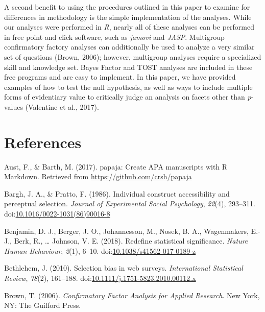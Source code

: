 \documentclass[english,man, mask]{apa6}
\theoremstyle{definition}
\theoremstyle{definition}
\theoremstyle{definition}
\theoremstyle{remark}
\begin{document}
A second benefit to using the procedures outlined in this paper to
examine for differences in methodology is the simple implementation of
the analyses. While our analyses were performed in \emph{R}, nearly all
of these analyses can be performed in free point and click software,
such as \emph{jamovi} and \emph{JASP}. Multigroup confirmatory factory
analyses can additionally be used to analyze a very similar set of
questions (Brown, 2006); however, multigroup analyses require a
specialized skill and knowledge set. Bayes Factor and TOST analyses are
included in these free programs and are easy to implement. In this
paper, we have provided examples of how to test the null hypothesis, as
well as ways to include multiple forms of evidentiary value to
critically judge an analysis on facets other than \emph{p}-values
(Valentine et al., 2017).

\newpage

\section{References}\label{references}

\setlength{\parindent}{-0.5in} \setlength{\leftskip}{0.5in}

\hypertarget{refs}{}
\hypertarget{ref-Aust2017}{}
Aust, F., \& Barth, M. (2017). papaja: Create APA manuscripts with R
Markdown. Retrieved from \url{https://github.com/crsh/papaja}

\hypertarget{ref-Bargh1986}{}
Bargh, J. A., \& Pratto, F. (1986). Individual construct accessibility
and perceptual selection. \emph{Journal of Experimental Social
Psychology}, \emph{22}(4), 293--311.
doi:\href{https://doi.org/10.1016/0022-1031(86)90016-8}{10.1016/0022-1031(86)90016-8}

\hypertarget{ref-Benjamin2017}{}
Benjamin, D. J., Berger, J. O., Johannesson, M., Nosek, B. A.,
Wagenmakers, E.-J., Berk, R., \ldots{} Johnson, V. E. (2018). Redefine
statistical significance. \emph{Nature Human Behaviour}, \emph{2}(1),
6--10.
doi:\href{https://doi.org/10.1038/s41562-017-0189-z}{10.1038/s41562-017-0189-z}

\hypertarget{ref-Bethlehem2010}{}
Bethlehem, J. (2010). Selection bias in web surveys. \emph{International
Statistical Review}, \emph{78}(2), 161--188.
doi:\href{https://doi.org/10.1111/j.1751-5823.2010.00112.x}{10.1111/j.1751-5823.2010.00112.x}

\hypertarget{ref-Brown2006}{}
Brown, T. (2006). \emph{Confirmatory Factor Analysis for Applied
Research}. New York, NY: The Guilford Press.
\end{document}
